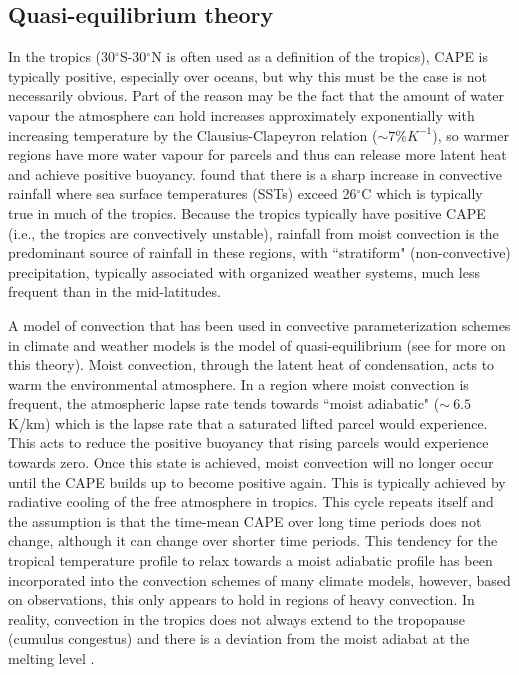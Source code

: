 \documentclass[letterpaper,12pt,titlepage,oneside,final]{book}
\begin{document}
\subsection{Quasi-equilibrium theory}

In the tropics (30$^\circ$S-30$^\circ$N is often used as a definition of the tropics), CAPE is typically positive, especially over oceans, but why this must be the case is not necessarily obvious. Part of the reason may be the fact that the amount of water vapour the atmosphere can hold increases approximately exponentially with increasing temperature by the Clausius-Clapeyron relation ($\sim{7\%}K^{-1}$), so warmer regions have more water vapour for parcels and thus can release more latent heat and achieve positive buoyancy. \citep{folkins_ian_tropical_2003} found that there is a sharp increase in convective rainfall where sea surface temperatures (SSTs) exceed 26$^{\circ}$C which is typically true in much of the tropics. Because the tropics typically have positive CAPE (i.e., the tropics are convectively unstable), rainfall from moist convection is the predominant source of rainfall in these regions, with ``stratiform" (non-convective) precipitation, typically associated with organized weather systems, much less frequent than in the mid-latitudes.

A model of convection that has been used in convective parameterization schemes in climate and weather models is the model of quasi-equilibrium \citep{arakawa_and_schubert_interaction_1974} (see \citep{emanuel_quasi-equilibrium_2007} for more on this theory). Moist convection, through the latent heat of condensation, acts to warm the environmental atmosphere. In a region where moist convection is frequent, the atmospheric lapse rate tends towards ``moist adiabatic" ($\sim{~6.5}$K/km) which is the lapse rate that a saturated lifted parcel would experience. This acts to reduce the positive buoyancy that rising parcels would experience towards zero. Once this state is achieved, moist convection will no longer occur until the CAPE builds up to become positive again. This is typically achieved by radiative cooling of the free atmosphere in tropics. This cycle repeats itself and the assumption is that the time-mean CAPE over long time periods does not change, although it can change over shorter time periods. This tendency for the tropical temperature profile to relax towards a moist adiabatic profile has been incorporated into the convection schemes of many climate models, however, based on observations, this only appears to hold in regions of heavy convection. In reality, convection in the tropics does not always extend to the tropopause (cumulus congestus) and there is a deviation from the moist adiabat at the melting level \citep{folkins_melting_2013}.
\end{document}
